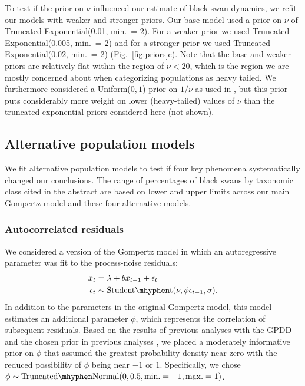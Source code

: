 To test if the prior on \(\nu\) influenced our estimate of black-swan dynamics,
we refit our models with weaker and stronger priors. Our base model used a
prior on \(\nu\) of Truncated-Exponential(0.01, min.\ = 2). For a weaker prior
we used Truncated-Exponential(0.005, min.\ = 2) and for a stronger prior we
used Truncated-Exponential(0.02, min.\ = 2) (Fig.~\ref{fig:priors}c). Note that
the base and weaker priors are relatively flat within the region of \(\nu <
20\), which is the region we are mostly concerned about when categorizing
populations as heavy tailed. We furthermore considered a Uniform(\(0, 1\))
prior on \(1/\nu\) as used in \citet{gelman2014}, but this
prior puts considerably more weight on lower (heavy-tailed) values of \(\nu\)
than the truncated exponential priors considered here (not shown).

\subsection{Alternative population models} We fit alternative population models to
test if four key phenomena systematically changed our conclusions. The range of
percentages of black swans by taxonomic class cited in the abstract are based
on lower and upper limits across our main Gompertz model and these four
alternative models.

\subsubsection{Autocorrelated residuals} We considered a version of the Gompertz
model in which an autoregressive parameter was fit to the process-noise
residuals: \begin{align} x_t &= \lambda + b x_{t-1} + \epsilon_t\\ \epsilon_t
&\sim \mathrm{Student\mhyphen t}(\nu, \phi \epsilon_{t-1}, \sigma). \end{align}
In addition to the parameters in the original Gompertz model, this model
estimates an additional parameter \(\phi\), which represents the correlation of
subsequent residuals. Based on the results of previous analyses with the
GPDD \citep{connors2014} and the chosen prior in previous
analyses \citep{thorson2014a}, we placed a moderately informative prior on
\(\phi\) that assumed the greatest probability density near zero with the
reduced possibility of \(\phi\) being near \(-1\) or \(1\). Specifically, we
chose \(\phi \sim \mathrm{Truncated\mhyphen Normal}(0, 0.5, \mathrm{min.} = -1,
\mathrm{max.} = 1)\).

